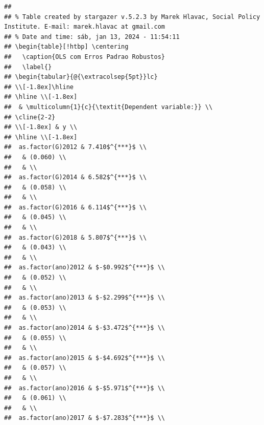 \documentclass[
]{article}
\begin{document}
\begin{verbatim}
## 
## % Table created by stargazer v.5.2.3 by Marek Hlavac, Social Policy Institute. E-mail: marek.hlavac at gmail.com
## % Date and time: sáb, jan 13, 2024 - 11:54:11
## \begin{table}[!htbp] \centering 
##   \caption{OLS com Erros Padrao Robustos} 
##   \label{} 
## \begin{tabular}{@{\extracolsep{5pt}}lc} 
## \\[-1.8ex]\hline 
## \hline \\[-1.8ex] 
##  & \multicolumn{1}{c}{\textit{Dependent variable:}} \\ 
## \cline{2-2} 
## \\[-1.8ex] & y \\ 
## \hline \\[-1.8ex] 
##  as.factor(G)2012 & 7.410$^{***}$ \\ 
##   & (0.060) \\ 
##   & \\ 
##  as.factor(G)2014 & 6.582$^{***}$ \\ 
##   & (0.058) \\ 
##   & \\ 
##  as.factor(G)2016 & 6.114$^{***}$ \\ 
##   & (0.045) \\ 
##   & \\ 
##  as.factor(G)2018 & 5.807$^{***}$ \\ 
##   & (0.043) \\ 
##   & \\ 
##  as.factor(ano)2012 & $-$0.992$^{***}$ \\ 
##   & (0.052) \\ 
##   & \\ 
##  as.factor(ano)2013 & $-$2.299$^{***}$ \\ 
##   & (0.053) \\ 
##   & \\ 
##  as.factor(ano)2014 & $-$3.472$^{***}$ \\ 
##   & (0.055) \\ 
##   & \\ 
##  as.factor(ano)2015 & $-$4.692$^{***}$ \\ 
##   & (0.057) \\ 
##   & \\ 
##  as.factor(ano)2016 & $-$5.971$^{***}$ \\ 
##   & (0.061) \\ 
##   & \\ 
##  as.factor(ano)2017 & $-$7.283$^{***}$ \\ 

\end{verbatim}
\end{document}
